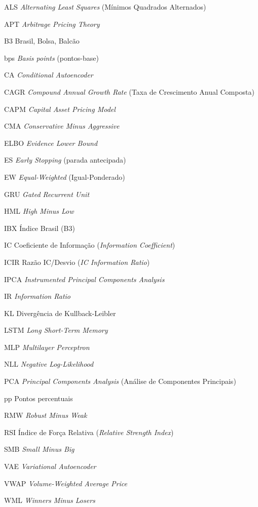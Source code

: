 \begin{siglas} \itemsep -1pt
  \item[ALS]    \textit{Alternating Least Squares} (Mínimos Quadrados Alternados)
  \item[APT]    \textit{Arbitrage Pricing Theory}
  \item[B3]     Brasil, Bolsa, Balcão
  \item[bps]    \textit{Basis points} (pontos-base)
  \item[CA]     \textit{Conditional Autoencoder}
  \item[CAGR]   \textit{Compound Annual Growth Rate} (Taxa de Crescimento Anual Composta)
  \item[CAPM]   \textit{Capital Asset Pricing Model}
  \item[CMA]    \textit{Conservative Minus Aggressive}
  \item[ELBO]   \textit{Evidence Lower Bound}
  \item[ES]     \textit{Early Stopping} (parada antecipada)
  \item[EW]     \textit{Equal-Weighted} (Igual-Ponderado)
  \item[GRU]    \textit{Gated Recurrent Unit}
  \item[HML]    \textit{High Minus Low}
  \item[IBX]    Índice Brasil (B3)
  \item[IC]     Coeficiente de Informação (\textit{Information Coefficient})
  \item[ICIR]   Razão IC/Desvio (\textit{IC Information Ratio})
  \item[IPCA]   \textit{Instrumented Principal Components Analysis}
  \item[IR]     \textit{Information Ratio}
  \item[KL]     Divergência de Kullback-Leibler
  \item[LSTM]   \textit{Long Short-Term Memory}
  \item[MLP]    \textit{Multilayer Perceptron}
  \item[NLL]    \textit{Negative Log-Likelihood}
  \item[PCA]    \textit{Principal Components Analysis} (Análise de Componentes Principais)
  \item[pp]     Pontos percentuais
  \item[RMW]    \textit{Robust Minus Weak}
  \item[RSI]    Índice de Força Relativa (\textit{Relative Strength Index})
  \item[SMB]    \textit{Small Minus Big}
  \item[VAE]    \textit{Variational Autoencoder}
  \item[VWAP]   \textit{Volume-Weighted Average Price}
  \item[WML]    \textit{Winners Minus Losers}
\end{siglas}
